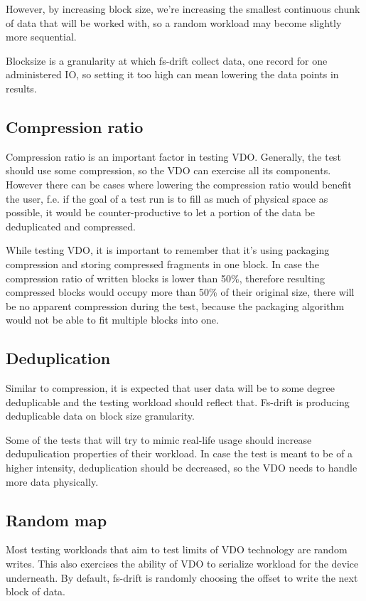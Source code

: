 \documentclass[
  color, %
  table, %
  lof,   %
  lot,   %
]{fithesis3}
\begin{document}
However, by increasing block size, we're increasing the smallest continuous chunk of data that will be worked with, so a random workload may become slightly more sequential.

Blocksize is a granularity at which fs-drift collect data, one record for one administered IO, so setting it too high can mean lowering the data points in results.

\subsection{Compression ratio}
Compression ratio is an important factor in testing VDO. Generally, the test should use some compression, so the VDO can exercise all its components. However there can be cases where lowering the compression ratio would benefit the user, f.e. if the goal of a test run is to fill as much of physical space as possible, it would be counter-productive to let a portion of the data be deduplicated and compressed.

While testing VDO, it is important to remember that it's using packaging compression and storing compressed fragments in one block. In case the compression ratio of written blocks is lower than 50\%, therefore resulting compressed blocks would occupy more than 50\% of their original size, there will be no apparent compression during the test, because the packaging algorithm would not be able to fit multiple blocks into one.

\subsection{Deduplication}
Similar to compression, it is expected that user data will be to some degree deduplicable and the testing workload should reflect that. Fs-drift is producing deduplicable data on block size granularity.

Some of the tests that will try to mimic real-life usage should increase dedupulication properties of their workload. In case the test is meant to be of a higher intensity, deduplication should be decreased, so the VDO needs to handle more data physically.


\subsection{Random map}
Most testing workloads that aim to test limits of VDO technology are random writes. This also exercises the ability of VDO to serialize workload for the device underneath. By default, fs-drift is randomly choosing the offset to write the next block of data.
\end{document}
